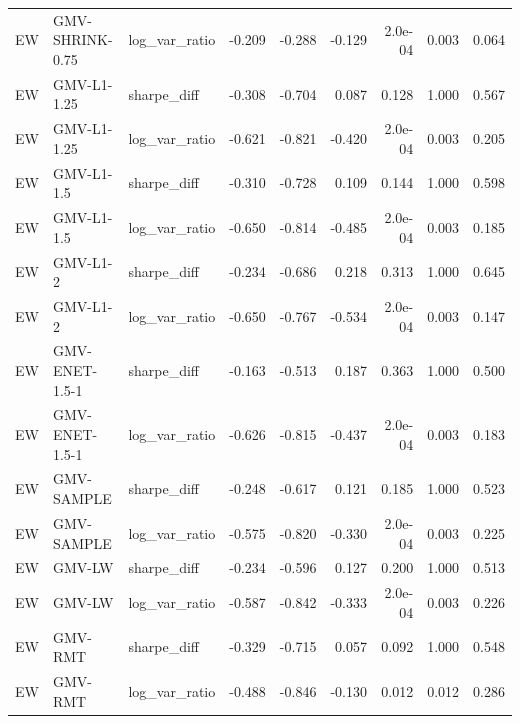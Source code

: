 \begin{table}[t]
{\begin{tabular}{lllrrrrrr}
EW & GMV-SHRINK-0.75 & log\_var\_ratio & -0.209 & -0.288 & -0.129 & 2.0e-04 & 0.003 & 0.064 \\
EW & GMV-L1-1.25 & sharpe\_diff & -0.308 & -0.704 & 0.087 & 0.128 & 1.000 & 0.567 \\
EW & GMV-L1-1.25 & log\_var\_ratio & -0.621 & -0.821 & -0.420 & 2.0e-04 & 0.003 & 0.205 \\
EW & GMV-L1-1.5 & sharpe\_diff & -0.310 & -0.728 & 0.109 & 0.144 & 1.000 & 0.598 \\
EW & GMV-L1-1.5 & log\_var\_ratio & -0.650 & -0.814 & -0.485 & 2.0e-04 & 0.003 & 0.185 \\
EW & GMV-L1-2 & sharpe\_diff & -0.234 & -0.686 & 0.218 & 0.313 & 1.000 & 0.645 \\
EW & GMV-L1-2 & log\_var\_ratio & -0.650 & -0.767 & -0.534 & 2.0e-04 & 0.003 & 0.147 \\
EW & GMV-ENET-1.5-1 & sharpe\_diff & -0.163 & -0.513 & 0.187 & 0.363 & 1.000 & 0.500 \\
EW & GMV-ENET-1.5-1 & log\_var\_ratio & -0.626 & -0.815 & -0.437 & 2.0e-04 & 0.003 & 0.183 \\
EW & GMV-SAMPLE & sharpe\_diff & -0.248 & -0.617 & 0.121 & 0.185 & 1.000 & 0.523 \\
EW & GMV-SAMPLE & log\_var\_ratio & -0.575 & -0.820 & -0.330 & 2.0e-04 & 0.003 & 0.225 \\
EW & GMV-LW & sharpe\_diff & -0.234 & -0.596 & 0.127 & 0.200 & 1.000 & 0.513 \\
EW & GMV-LW & log\_var\_ratio & -0.587 & -0.842 & -0.333 & 2.0e-04 & 0.003 & 0.226 \\
EW & GMV-RMT & sharpe\_diff & -0.329 & -0.715 & 0.057 & 0.092 & 1.000 & 0.548 \\
EW & GMV-RMT & log\_var\_ratio & -0.488 & -0.846 & -0.130 & 0.012 & 0.012 & 0.286 \\
\bottomrule
\end{tabular}}
\end{table}
